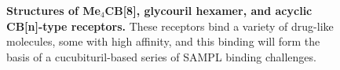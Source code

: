 \documentclass[11pt]{article}
\begin{document}
\begin{figure}[h]
\begin{centering}

\end{centering}

\vspace{0.1in}
\caption{\label{figure:CB} \footnotesize {\bf Structures of Me$_4$CB[8], glycouril hexamer, and acyclic CB[n]-type receptors.} These receptors bind a variety of drug-like molecules, some with high affinity, and this binding will form the basis of a cucubituril-based series of SAMPL binding challenges.}

\end{figure}
\end{document}
